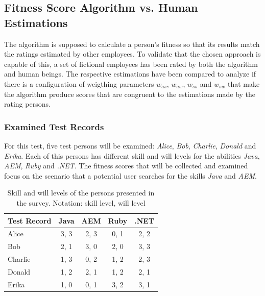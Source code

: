 \newpage

\subsection{Fitness Score Algorithm vs. Human Estimations}
The algorithm is supposed to calculate a person's fitness so that its results match the ratings estimated by other employees. To validate that
the chosen approach is capable of this, a set of fictional employees has been rated by both the algorithm and human beings. The respective estimations have been compared to analyze if there is a configuration of weigthing parameters $w_{as}$, $w_{aw}$, $w_{ss}$ and $w_{sw}$ that make the algorithm produce scores that are
congruent to the estimations made by the rating persons.

\subsubsection{Examined Test Records}
For this test, five test persons will be examined: \textit{Alice}, \textit{Bob}, \textit{Charlie}, \textit{Donald} and \textit{Erika}. Each of this persons has different skill and will levels for the abilities \textit{Java}, \textit{AEM}, \textit{Ruby} and \textit{.NET}. The fitness scores that will be collected and examined focus on the scenario that a potential user searches for the skills \textit{Java} and \textit{AEM}.
\begin{table}[H]
\centering
  \begin{tabular}{l||c|c|c|c}
		Test Record  & Java & AEM & Ruby & .NET\\
		\hline
		Alice   & 3, 3   & 2, 3  & 0, 1   & 2, 2 \\
		Bob     & 2, 1   & 3, 0  & 2, 0   & 3, 3 \\
		Charlie & 1, 3   & 0, 2  & 1, 2   & 2, 3 \\
		Donald  & 1, 2   & 2, 1  & 1, 2   & 2, 1 \\
		Erika   & 1, 0   & 0, 1  & 3, 2   & 3, 1 \\
  \end{tabular}
\caption[Survey: Test Record Overview]{Skill and will levels of the persons presented in the survey. Notation: skill level, will level}
\end{table}

\newpage
